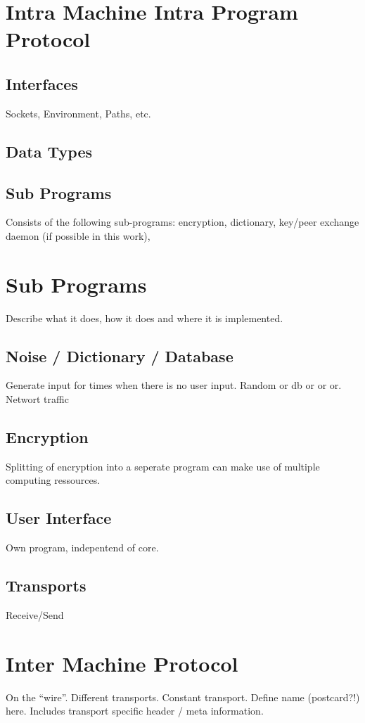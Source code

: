 \documentclass[12pt,a4paper]{article}
\begin{document}
\section{Intra Machine Intra Program Protocol}
\subsection{Interfaces}
Sockets, Environment, Paths, etc.
\subsection{Data Types}
\subsection{Sub Programs}
Consists of the following sub-programs:
encryption, dictionary, key/peer exchange daemon (if possible in this work),
\section{Sub Programs}
Describe what it does, how it does and where it is implemented.
\subsection{Noise / Dictionary / Database}
Generate input for times when there is no user input.
Random or db or or or.
Networt traffic
\subsection{Encryption}
Splitting of encryption into a seperate program can make use of
multiple computing ressources.
\subsection{User Interface}
Own program, indepentend of core.
\subsection{Transports}
Receive/Send

\section{Inter Machine Protocol}
On the "`wire"'. Different transports. Constant transport.
Define name (postcard?!) here. Includes transport specific
header / meta information.
\end{document}
